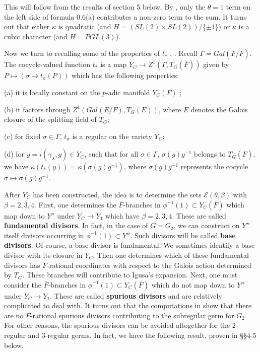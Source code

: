 \documentclass[12pt,letterpaper]{amsart}
\newcommand{\ovF}{\overline{F}}
\begin{document}
This will follow from the results of section 5 below.
By \cite[ch 6, \S 2]{Ha92a}, only the $\theta =1$
term on the left side of formula 0.6(a) contributes a non-zero
term to the sum.
It turns out that either $\kappa$ is
quadratic (and $H=(SL(2)\times SL(2))/\{\pm 1\}$)
or $\kappa$ is a cubic character (and $H=PGL(3)$).

Now we turn to recalling some of the properties of $t_*$ \cite{La83},
\cite{Ha92a}. Recall $\Gamma=Gal(\overline{F}/F)$.
The cocycle-valued function $t_*$ is a map
$Y_C\rightarrow Z^1(\Gamma, T_G(\overline{F}))$ given by
$P\longmapsto (\sigma\longmapsto t_\sigma(P))$
which has the following properties:

\noindent
(a) it is locally constant on the $p$-adic manifold $Y_C(F)$ \cite{La83};

\noindent
(b) it factors through $Z^1(Gal(E/F), T_G(E))$,
where $E$ denotes the Galois closure of the splitting
field of $T_G$;

\noindent
(c) for fixed $\sigma\in \Gamma$, $t_\sigma$ is a regular on the variety
$Y_C$;

\noindent
(d) for $y=i(\gamma_\lambda ,g)\in Y_C$, such that for all
$\sigma\in \Gamma$,
$\sigma(g)g^{-1}$ belongs to $T_G(\overline{F})$, we have
$\kappa (t_*(y))=\kappa(\sigma(g)g^{-1})$, where
$\sigma(g)g^{-1}$ represents
the cocycle $\sigma\longmapsto \sigma(g)g^{-1}$.

After $Y_C$ has been constructed, the idea is to determine the sets
${\mathcal E}(\theta, \beta)$ with $\beta =2,3,4$. First,
one determines the $\ovF$-branches in $\phi^{-1}(1)\subset Y_C(\ovF)$ which
map down to $Y''$ under $Y_C\rightarrow Y_1$ which have
$\beta =2,3,4$. These are called \textbf{fundamental divisors}.
In fact, in the case of $G=G_2$, we can construct on $Y''$ itself
divisors occurring in $\phi^{-1}(1)\subset Y''$.
Such divisors will be called \textbf{base divisors}.
Of course, a base divisor is fundamental.
We sometimes identify a base divisor with its closure in $Y_C$.
Then one determines which of these fundamental divisors
has $F$-rational
coordinates with respect to the Galois action determined by $T_G$.
These branches will contribute to Igusa's
expansion. Next, one must consider the $\ovF$-branches in
$\phi^{-1}(1)\subset Y_C(\ovF)$ which do not
map down to $Y''$ under $Y_C\rightarrow Y_1$. These are
called \textbf{spurious divisors} and are relatively complicated to deal with.
It turns
out that the computations in \cite[Ch III]{Ha92a} show that there are
no $F$-rational spurious divisors contributing to the subregular germ
for $G_2$. For other reasons, the spurious divisors can be avoided
altogether for the $2$-regular and $3$-regular germs.
In fact, we have the following result, proven in \S\S 4-5 below.
\end{document}
